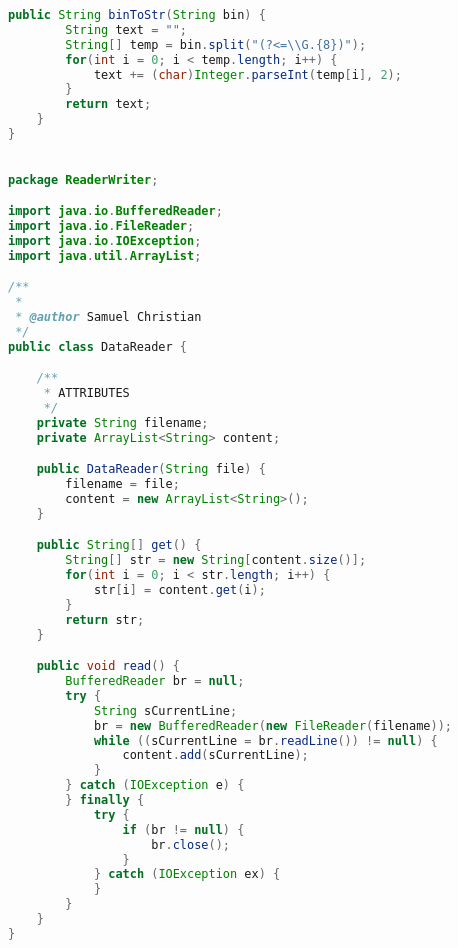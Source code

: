 \begin{lstlisting}[language=Java,basicstyle=\tiny,caption=DESDecryption.java]
    public String binToStr(String bin) {
        String text = "";
        String[] temp = bin.split("(?<=\\G.{8})");
        for(int i = 0; i < temp.length; i++) {
            text += (char)Integer.parseInt(temp[i], 2);
        }
        return text;
    }
}

\end{lstlisting}

\begin{lstlisting}[language=Java,basicstyle=\tiny,caption=DataReader.java]

package ReaderWriter;

import java.io.BufferedReader;
import java.io.FileReader;
import java.io.IOException;
import java.util.ArrayList;

/**
 *
 * @author Samuel Christian
 */
public class DataReader {

    /**
     * ATTRIBUTES
     */
    private String filename;
    private ArrayList<String> content;

    public DataReader(String file) {
        filename = file;
        content = new ArrayList<String>();
    }

    public String[] get() {
        String[] str = new String[content.size()];
        for(int i = 0; i < str.length; i++) {
            str[i] = content.get(i);
        }
        return str;
    }

    public void read() {
        BufferedReader br = null;
        try {
            String sCurrentLine;
            br = new BufferedReader(new FileReader(filename));
            while ((sCurrentLine = br.readLine()) != null) {
                content.add(sCurrentLine);
            }
        } catch (IOException e) {
        } finally {
            try {
                if (br != null) {
                    br.close();
                }
            } catch (IOException ex) {
            }
        }
    }
}

\end{lstlisting}

